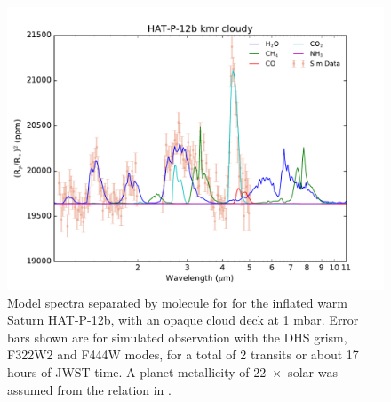 \documentclass[iop]{emulateapj}
\begin{document}
\begin{figure}[t]
\centering
\includegraphics[width=1.0\columnwidth]{HAT-P-12b_kmr_cloudy_dhs.pdf}
\caption{Model spectra separated by molecule for for the inflated warm Saturn HAT-P-12b, with an opaque cloud deck at 1 mbar.
Error bars shown are for simulated observation with the DHS grism, F322W2 and F444W modes, for a total of 2 transits or about 17 hours of JWST time. A planet metallicity of 22~$\times$~solar was assumed from the relation in \citet{kreidberg2014wasp43}.}\label{fig:HATp12spec}
\end{figure}

\end{document}
